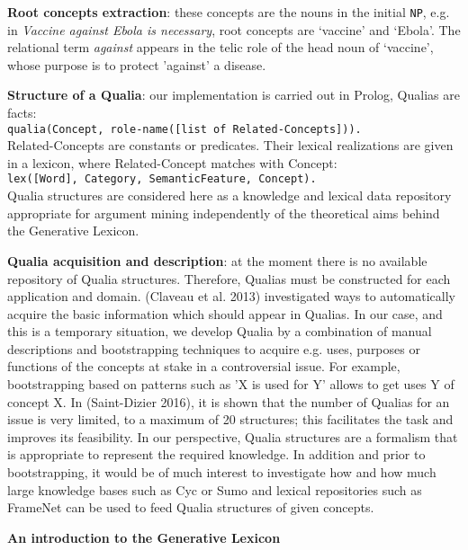\documentclass[11pt,letterpaper]{article}
\begin{document}
{\bf Root concepts extraction}: these concepts are the nouns in the initial {\tt NP}, e.g. in {\it Vaccine against Ebola is necessary}, root concepts are `vaccine' and `Ebola'. The relational term {\it against} appears in the telic role of the head noun of  `vaccine', whose purpose is to protect 'against' a disease.

{\bf Structure of a Qualia}: our implementation is carried out in Prolog, Qualias are facts:\\
{\small
{\tt qualia(Concept, role-name([list of Related-Concepts])).}}\\
Related-Concepts are constants or predicates. Their lexical realizations are given in a lexicon, where Related-Concept matches with Concept:\\
{\small
{\tt lex([Word], Category, SemanticFeature, Concept).}}\\
Qualia structures are considered here as a knowledge and lexical data repository appropriate for argument mining independently of the theoretical aims behind the Generative Lexicon.

{\bf Qualia acquisition and description}: at the moment there is no available repository of Qualia structures. Therefore, Qualias must be constructed for each application and domain. (Claveau et al. 2013)  investigated ways to automatically acquire the basic information which should appear in Qualias. In our case, and this is a temporary situation, we develop Qualia by a combination of manual descriptions and bootstrapping techniques to acquire e.g. uses, purposes or functions of the concepts
at stake in a controversial issue. For example, bootstrapping based on patterns such as  'X is used for Y' allows to get uses Y of concept X. In (Saint-Dizier 2016), it is shown that the number of Qualias for an issue is very limited, to a maximum of 20 structures; this
facilitates the task and improves its feasibility. 
In our perspective, Qualia structures are a formalism that is appropriate to represent the required knowledge. In addition and prior to bootstrapping, it would  be of much interest to investigate how and how much large knowledge bases such as Cyc or Sumo and lexical repositories such as FrameNet can be used to feed Qualia structures of given concepts.

{\bf An introduction to the Generative Lexicon}
\end{document}
